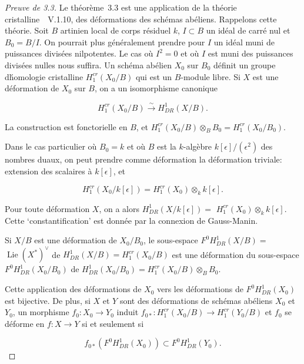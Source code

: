 \documentclass[11pt,a4paper]{article}
\theoremstyle{plain}
\theoremstyle{definition}
\DeclareMathOperator{\Lie}{Lie}
\begin{document}
\begin{proof}[Preuve de 3.3]
Le th\'eor\`eme~3.3 est une application de la th\'eorie cristalline~\cite{Messing}~V.1.10, des
d\'eformations des sch\'emas ab\'eliens. Rappelons cette th\'eorie. Soit $B$ artinien
local de corps r\'esiduel $k$, $I \subset B$ un id\'eal de carr\'e nul et $B_0 = B/I$. On pourrait
plus g\'en\'eralement prendre pour $I$ un id\'eal muni de puissances divis\'ees
nilpotentes. Le cas o\`u $I^2 = 0$ et o\`u $I$ est muni des puissances divis\'ees nulles
nous suffira. Un sch\'ema ab\'elien $X_0$ sur $B_0$ d\'efinit un groupe d\'homologie
cristalline $H^{cr}_1(X_0/B)$ qui est un $B$-module libre. Si $X$ est une d\'eformation de
$X_0$ sur $B$, on a un isomorphisme canonique

\begin{equation}
H^{cr}_1(X_0/B) \xrightarrow{\sim} H^1_{DR}(X/B).
\end{equation}

La construction est fonctorielle en $B$, et $H^{cr}_1(X_0/B) \otimes_B B_0 =
H^{cr}_1(X_0/B_0)$.

Dans le cas particulier o\`u $B_0 = k$ et o\`u $B$ est la $k$-alg\`ebre $k[\epsilon]/(\epsilon^2)$ des
nombres duaux, on peut prendre comme d\'eformation la d\'eformation triviale:
extension des scalaires \`a $k[\epsilon]$, et

\begin{equation}
H^{cr}_1(X_0/k[\epsilon]) = H^{cr}_1(X_0) \otimes_k k[\epsilon].
\end{equation}

Pour toute d\'eformation $X$, on a alors $H^1_{DR}(X/k[\epsilon]) =$
$H^{cr}_1(X_0) \otimes_k k[\epsilon]$. Cette
`constantification' est donn\'ee par la connexion de Gauss-Manin.

Si $X/B$ est une d\'eformation de $X_0/B_0$, le sous-espace $F^0 H^1_{DR}(X/B) =$
$\Lie(X^*)^\vee$ de $H^1_{DR}(X/B) = H^{cr}_1(X_0/B)$ est une d\'eformation du sous-espace
$F^0 H^1_{DR}(X_0/B_0)$ de $H^1_{DR}(X_0/B_0) = H^{cr}_1(X_0/B) \otimes_B B_0$.

Cette application des d\'eformations de $X_0$ vers les d\'eformations de
$F^0 H^1_{DR}(X_0)$ est bijective. De plus, si $X$ et $Y$ sont des d\'eformations de sch\'emas
ab\'eliens $X_0$ et $Y_0$, un morphisme $f_0 : X_0 \to Y_0$ induit $f_{0*}: H^{cr}_1(X_0/B) \to H^{cr}_1(Y_0/B)$
et $f_0$ se d\'eforme en $f: X \to Y$ si et seulement si

\begin{equation}
f_{0*}(F^0 H^1_{DR}(X_0)) \subset F^0 H^1_{DR}(Y_0).
\end{equation}


\end{proof}
\end{document}
